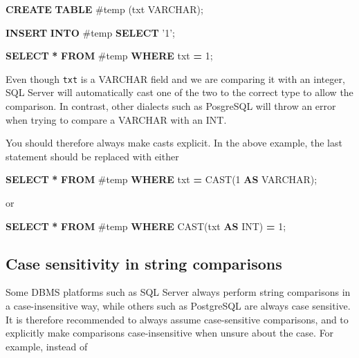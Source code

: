 \documentclass[
]{article}
\newenvironment{Shaded}{\begin{snugshade}}{\end{snugshade}}
\newcommand{\DataTypeTok}[1]{\textcolor[rgb]{0.13,0.29,0.53}{#1}}
\newcommand{\DecValTok}[1]{\textcolor[rgb]{0.00,0.00,0.81}{#1}}
\newcommand{\FunctionTok}[1]{\textcolor[rgb]{0.00,0.00,0.00}{#1}}
\newcommand{\KeywordTok}[1]{\textcolor[rgb]{0.13,0.29,0.53}{\textbf{#1}}}
\newcommand{\NormalTok}[1]{#1}
\newcommand{\OperatorTok}[1]{\textcolor[rgb]{0.81,0.36,0.00}{\textbf{#1}}}
\newcommand{\StringTok}[1]{\textcolor[rgb]{0.31,0.60,0.02}{#1}}
\begin{document}
\begin{Shaded}
\begin{Highlighting}[]
\KeywordTok{CREATE} \KeywordTok{TABLE}\NormalTok{ #temp (txt }\DataTypeTok{VARCHAR}\NormalTok{);}

\KeywordTok{INSERT} \KeywordTok{INTO}\NormalTok{ #temp}
\KeywordTok{SELECT} \StringTok{'1'}\NormalTok{;}

\KeywordTok{SELECT} \OperatorTok{*} \KeywordTok{FROM}\NormalTok{ #temp }\KeywordTok{WHERE}\NormalTok{ txt }\OperatorTok{=} \DecValTok{1}\NormalTok{;}
\end{Highlighting}
\end{Shaded}

Even though \texttt{txt} is a VARCHAR field and we are comparing it with
an integer, SQL Server will automatically cast one of the two to the
correct type to allow the comparison. In contrast, other dialects such
as PosgreSQL will throw an error when trying to compare a VARCHAR with
an INT.

You should therefore always make casts explicit. In the above example,
the last statement should be replaced with either

\begin{Shaded}
\begin{Highlighting}[]
\KeywordTok{SELECT} \OperatorTok{*} \KeywordTok{FROM}\NormalTok{ #temp }\KeywordTok{WHERE}\NormalTok{ txt }\OperatorTok{=} \FunctionTok{CAST}\NormalTok{(}\DecValTok{1} \KeywordTok{AS} \DataTypeTok{VARCHAR}\NormalTok{);}
\end{Highlighting}
\end{Shaded}

or

\begin{Shaded}
\begin{Highlighting}[]
\KeywordTok{SELECT} \OperatorTok{*} \KeywordTok{FROM}\NormalTok{ #temp }\KeywordTok{WHERE} \FunctionTok{CAST}\NormalTok{(txt }\KeywordTok{AS} \DataTypeTok{INT}\NormalTok{) }\OperatorTok{=} \DecValTok{1}\NormalTok{;}
\end{Highlighting}
\end{Shaded}

\hypertarget{case-sensitivity-in-string-comparisons}{%
\subsection{Case sensitivity in string
comparisons}\label{case-sensitivity-in-string-comparisons}}

Some DBMS platforms such as SQL Server always perform string comparisons
in a case-insensitive way, while others such as PostgreSQL are always
case sensitive. It is therefore recommended to always assume
case-sensitive comparisons, and to explicitly make comparisons
case-insensitive when unsure about the case. For example, instead of
\end{document}

